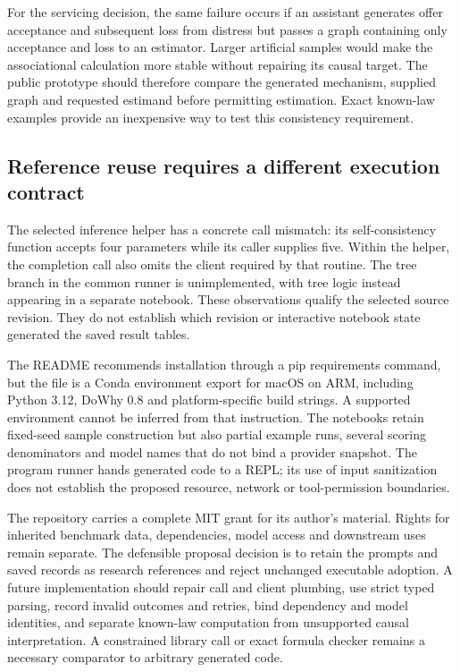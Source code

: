 For the servicing decision, the same failure occurs if an assistant generates
offer acceptance and subsequent loss from distress but passes a graph containing
only acceptance and loss to an estimator. Larger artificial samples would make
the associational calculation more stable without repairing its causal target.
The public prototype should therefore compare the generated mechanism, supplied
graph and requested estimand before permitting estimation. Exact known-law
examples provide an inexpensive way to test this consistency requirement.

\subsection{Reference reuse requires a different execution contract}
\label{exec21:prophetsrepo-reuse}
The selected inference helper has a concrete call mismatch: its self-consistency
function accepts four parameters while its caller supplies five. Within the
helper, the completion call also omits the client required by that routine.
The tree branch in the common runner is unimplemented, with tree logic instead
appearing in a separate notebook. These observations qualify the selected
source revision. They do not establish which revision or interactive notebook
state generated the saved result tables.~\citep{exec21_prophets_repo}

The README recommends installation through a pip requirements command, but the
file is a Conda environment export for macOS on ARM, including Python 3.12,
DoWhy 0.8 and platform-specific build strings. A supported environment cannot
be inferred from that instruction. The notebooks retain fixed-seed sample
construction but also partial example runs, several scoring denominators and
model names that do not bind a provider snapshot. The program runner hands
generated code to a REPL; its use of input sanitization does not establish the
proposed resource, network or tool-permission boundaries.
\citep{exec21_prophets_repo}

The repository carries a complete MIT grant for its author's material. Rights
for inherited benchmark data, dependencies, model access and downstream uses
remain separate. The defensible proposal decision is to retain the prompts
and saved records as research references and reject unchanged executable
adoption. A future implementation should repair call and client plumbing,
use strict typed parsing, record invalid outcomes and retries, bind dependency
and model identities, and separate known-law computation from unsupported
causal interpretation. A constrained library call or exact formula checker
remains a necessary comparator to arbitrary generated code.
\citep{exec21_prophets_repo}

